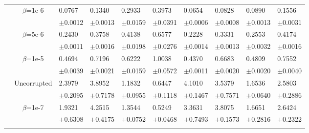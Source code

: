 \documentclass{article}
\begin{document}
\begin{table}[h!]
{\begin{tabularx}{\textwidth}{ccX X X X X X X X}
        & \multirow{2}{*}{$\beta$=1e-6}
        & 0.0767 & 0.1340 & 0.2933 & 0.3973 & 0.0654 & 0.0828 & 0.0890 & 0.1556\\
        &&\scriptsize$\pm$0.0012 & \scriptsize $\pm$0.0013 & \scriptsize $\pm$0.0159 & \scriptsize $\pm$0.0391 & \scriptsize $\pm$0.0006 & \scriptsize $\pm$0.0008 & \scriptsize $\pm$0.0013 & \scriptsize $\pm$0.0031\\



        \cline{3-10}\rule{0pt}{2.3ex}

        & \multirow{2}{*}{$\beta$=5e-6}
        & 0.2430 & 0.3758 & 0.4138 & 0.6577 & 0.2228 & 0.3331 & 0.2553 & 0.4174\\
        &&\scriptsize$\pm$0.0011 & \scriptsize $\pm$0.0016 & \scriptsize $\pm$0.0198 & \scriptsize $\pm$0.0276 & \scriptsize $\pm$0.0014 & \scriptsize $\pm$0.0013 & \scriptsize $\pm$0.0032 & \scriptsize $\pm$0.0016\\

        \cline{3-10}\rule{0pt}{2.3ex}

        & \multirow{2}{*}{$\beta$=1e-5}
        & 0.4694 & 0.7196 & 0.6222 & 1.0038 & 0.4370 & 0.6683 & 0.4809 & 0.7552\\
        &&\scriptsize$\pm$0.0039 & \scriptsize $\pm$0.0021 & \scriptsize $\pm$0.0159 & \scriptsize $\pm$0.0572 & \scriptsize $\pm$0.0011 & \scriptsize $\pm$0.0020 & \scriptsize $\pm$0.0020 & \scriptsize $\pm$0.0040\\

        \hline\rule{0pt}{2.3ex}
    
        \multirow{12}{*}{  \textsf{MAE\textsubscript{ef}}}

        &\multirow{2}{*}{Uncorrupted}
        &2.3979 & 3.8952 & 1.1832 & 0.6447 & 4.1010 & 3.5379 & 1.6536 & 2.5803\\
        &&\scriptsize$\pm$0.2095 & \scriptsize $\pm$0.7178 & \scriptsize $\pm$0.0955 & \scriptsize $\pm$0.1118 & \scriptsize $\pm$0.1467 & \scriptsize $\pm$0.7571 & \scriptsize $\pm$0.0640 & \scriptsize $\pm$0.2886\\
        \cline{3-10}\rule{0pt}{2.3ex}

        & \multirow{2}{*}{$\beta$=1e-7}
        & 1.9321 & 4.2515 & 1.3544 & 0.5249 & 3.3631 & 3.8075 & 1.6651 & 2.6424\\
        &&\scriptsize$\pm$0.6308 & \scriptsize $\pm$0.4175 & \scriptsize $\pm$0.0752 & \scriptsize $\pm$0.0468 & \scriptsize $\pm$0.7493 & \scriptsize $\pm$0.1573 & \scriptsize $\pm$0.2816 & \scriptsize $\pm$0.2322\\
        \cline{3-10}\rule{0pt}{2.3ex}


\end{tabularx}}
\end{table}
\end{document}
